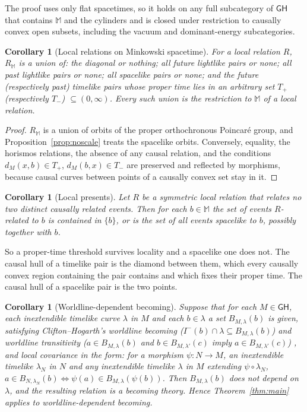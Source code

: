 \documentclass[11pt]{article}
\newtheorem{corollary}[theorem]{Corollary}
\theoremstyle{definition}
\newcommand{\GH}{\mathsf{GH}}
\newcommand{\Mink}{\mathbb M}
\newcommand{\Ichr}{I^{-}}
\begin{document}
The proof uses only flat spacetimes, so it holds on any full subcategory of
$\GH$ that contains $\Mink$ and the cylinders and is closed under restriction
to causally convex open subsets, including the vacuum and dominant-energy
subcategories.

\begin{corollary}[Local relations on Minkowski spacetime]\label{cor:localrel}
For a local relation $R$, $R_\Mink$ is a union of: the diagonal or nothing;
all future lightlike pairs or none; all past lightlike pairs or none; all
spacelike pairs or none; and the future (respectively past) timelike pairs
whose proper time lies in an arbitrary set $T_+$ (respectively $T_-$)
$\subseteq(0,\infty)$. Every such union is the restriction to $\Mink$ of a
local relation.
\end{corollary}

\begin{proof}
$R_\Mink$ is a union of orbits of the proper orthochronous Poincaré group, and
Proposition~\ref{prop:noscale} treats the spacelike orbits. Conversely,
equality, the horismos relations, the absence of any causal relation, and the
conditions $d_M(x,b)\in T_+$, $d_M(b,x)\in T_-$ are preserved and reflected by
morphisms, because causal curves between points of a causally convex set stay
in it.
\end{proof}

\begin{corollary}[Local presents]\label{cor:localpresent}
Let $R$ be a symmetric local relation that relates no two distinct causally
related events. Then for each $b\in\Mink$ the set of events $R$-related to $b$
is contained in $\{b\}$, or is the set of all events spacelike to $b$,
possibly together with $b$.
\end{corollary}

So a proper-time threshold survives locality and a spacelike one does not.
The causal hull of a timelike pair is the diamond between them, which every
causally convex region containing the pair contains and which fixes their
proper time. The causal hull of a spacelike pair is the two points.

\begin{corollary}[Worldline-dependent becoming]\label{cor:worldline}
Suppose that for each $M\in\GH$, each inextendible timelike curve $\lambda$ in
$M$ and each $b\in\lambda$ a set $B_{M,\lambda}(b)$ is given, satisfying
Clifton--Hogarth's worldline becoming ($\Ichr(b)\cap\lambda\subseteq
B_{M,\lambda}(b)$) and worldline transitivity ($a\in B_{M,\lambda}(b)$ and
$b\in B_{M,\lambda'}(c)$ imply $a\in B_{M,\lambda'}(c)$) \citep[pp.~362--363]{CH1995},
and local covariance in the form: for a morphism $\psi:N\to M$, an inextendible
timelike $\lambda_N$ in $N$ and any inextendible timelike $\lambda$ in $M$
extending $\psi\circ\lambda_N$, $a\in B_{N,\lambda_N}(b)\iff\psi(a)\in
B_{M,\lambda}(\psi(b))$. Then $B_{M,\lambda}(b)$ does not depend on $\lambda$, and
the resulting relation is a becoming theory. Hence Theorem~\ref{thm:main}
applies to worldline-dependent becoming.
\end{corollary}
\end{document}
